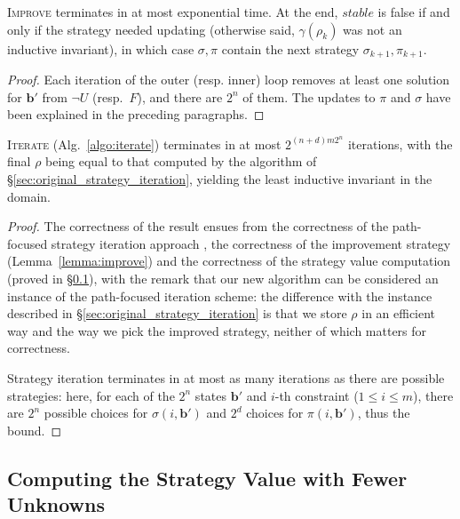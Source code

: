 \documentclass{llncs}
\newcommand{\pponly}[1]{}
\newcommand{\rronly}[1]{#1}
\renewcommand{\vec}[1]{{\boldsymbol #1}}
\begin{document}
\pponly{\vspace*{-4ex}}
\rronly{
\begin{lemma}\label{lemma:improve}
\textsc{Improve} terminates in at most exponential time. At the end,
$\mathit{stable}$ is false if and only if the strategy needed updating
(otherwise said, $\gamma(\rho_k)$ was not an inductive invariant), in
which case $\sigma,\pi$ contain the next strategy
$\sigma_{k+1},\pi_{k+1}$.
\end{lemma}
\begin{proof}
Each iteration of the outer (resp. inner) loop removes at least one
solution for $\vec{b}'$ from $\neg U$ (resp.~$F$), and there are $2^n$
of them. The updates to $\pi$ and $\sigma$ have been explained in the
preceding paragraphs.
\end{proof}}
\begin{theorem}
\textsc{Iterate} (Alg.~\ref{algo:iterate}) terminates in at most
$2^{(n+d)m2^n}$ iterations, with the final $\rho$ being equal to that
computed by the algorithm of \S\ref{sec:original_strategy_iteration},
yielding the least inductive invariant in the domain.\pponly{\footnote{
Due to space limitations, we refer to the extended version
\cite{MS14a} for the proofs.}}
\end{theorem}
\rronly{
\begin{proof}
The correctness of the result ensues from the correctness of the
path-focused strategy iteration approach
\cite{Gawlitza_Monniaux_LMCS12}, the correctness of the improvement
strategy (Lemma~\ref{lemma:improve}) and the correctness of the
strategy value computation (proved in \S\ref{sec:new_strategy_value}),
with the remark\rronly{ that our new algorithm can be considered an
  instance of the path-focused iteration scheme: the difference with
  the instance described in \S\ref{sec:original_strategy_iteration} is
  that we store $\rho$ in an efficient way and the way we pick the
  improved strategy, neither of which matters for correctness}.

Strategy iteration terminates in at most as many iterations as there
are possible strategies: here, for each of the $2^n$ states $\vec{b}'$
and $i$-th constraint ($1 \leq i \leq m$), there are $2^n$ possible
choices for $\sigma(i,\vec{b}')$ and $2^d$ choices for
$\pi(i,\vec{b}')$, thus the bound.
\end{proof}}
\pponly{\vspace*{-4ex}}


\subsection{Computing the Strategy Value with Fewer Unknowns}
\label{sec:new_strategy_value}
\end{document}
